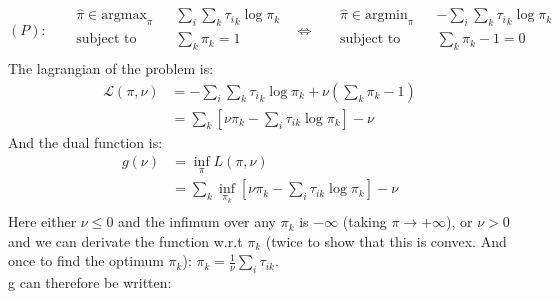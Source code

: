 \documentclass{article}
\begin{document}
\begin{equation*}
    (P):\;\;\;
    \begin{aligned}
         & \widehat{\pi} \in \text{argmax}_\pi &  & \sum_i \sum_k {\tau_i}_k \log \pi_k \\
         & \text{subject to}                   &  & \sum_k \pi_k = 1                    \\
    \end{aligned}
    \;\;\Leftrightarrow\;\;
    \begin{aligned}
         & \widehat{\pi} \in \text{argmin}_\pi &  & - \sum_i \sum_k {\tau_i}_k \log \pi_k \\
         & \text{subject to}                   &  & \sum_k \pi_k - 1 = 0                  \\
    \end{aligned}
\end{equation*}
The lagrangian of the problem is:
\begin{equation*}
    \begin{aligned}
        \mathcal{L}(\pi, \nu) & = - \sum_i \sum_k {\tau_i}_k \log \pi_k + \nu (\sum_k \pi_k -1)       \\
                              & =  \sum_k \left[ \nu \pi_k - \sum_i \tau_{ik} \log \pi_k\right] - \nu
    \end{aligned}
\end{equation*}
And the dual function is:
\begin{equation*}
    \begin{aligned}
        g(\nu) & = \inf_\pi L(\pi, \nu)                                                             \\
               & =  \sum_k \inf_{\pi_k} \left[ \nu \pi_k - \sum_i \tau_{ik} \log \pi_k\right] - \nu \\
    \end{aligned}
\end{equation*}
Here either $\nu \le 0$ and the infimum over any $\pi_k$ is $-\infty$ (taking $\pi \rightarrow +\infty$), or $\nu > 0$ and
we can derivate the function w.r.t $\pi_k$ (twice to show that this is convex. And once to find the optimum $\pi_k$):
$\pi_k = \frac{1}{\nu} \sum_i \tau_{ik}$.\\
g can therefore be written:
\end{document}
